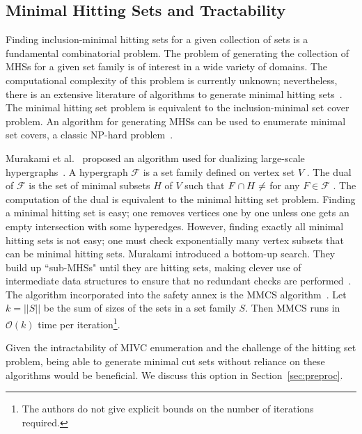 \subsection{Minimal Hitting Sets and Tractability}
Finding inclusion-minimal hitting sets for a given collection of sets is a fundamental combinatorial problem. The problem of generating the collection of MHSs for a given set family is of interest in a wide variety of domains. The computational complexity of this problem is currently unknown; nevertheless, there is an extensive literature of algorithms to generate minimal hitting sets~\cite{gainer2017minimal}. The minimal hitting set problem is equivalent to the inclusion-minimal set cover problem. An algorithm for generating MHSs can be used to enumerate minimal set covers, a classic NP-hard problem~\cite{karp1972reducibility}. 

Murakami et al.~ proposed an algorithm used for dualizing large-scale hypergraphs~\cite{murakami2013efficient}. A hypergraph $\mathcal{F}$ is a set family defined on vertex set $V$ . The dual of $\mathcal{F}$ is the set of minimal subsets $H$ of $V$ such that $F \cap H \not = \empty$ for any $F \in \mathcal{F}$ . The computation of the dual is equivalent to the minimal hitting set problem. Finding a minimal hitting set is easy; one removes vertices one by one unless one gets an empty intersection with some hyperedges. However, finding exactly all minimal hitting sets is not easy; one must check exponentially many vertex subsets that can be minimal hitting sets. Murakami introduced a bottom-up search. They build up ``sub-MHSs" until they are hitting sets, making clever use of intermediate data structures to ensure that no redundant checks are performed~\cite{gainer2017minimal}. The algorithm incorporated into the safety annex is the MMCS algorithm~\cite{murakami2013efficient}. Let $k = ||S||$ be the sum of sizes of the sets in a set family $S$. Then MMCS runs in $\mathcal{O}(k)$ time per iteration\footnote{The authors do not give explicit bounds on the number of iterations required.}.

Given the intractability of MIVC enumeration and the challenge of the hitting set problem, being able to generate minimal cut sets without reliance on these algorithms would be beneficial. We discuss this option in Section~\ref{sec:preproc}.

